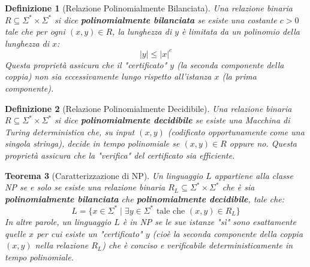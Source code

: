 \documentclass[a4paper, 11pt]{book} %
\newtheorem{theorem}{Teorema}[section]
\newtheorem{definition}[theorem]{Definizione}
\theoremstyle{definition}
\begin{document}
\begin{definition}[Relazione Polinomialmente Bilanciata]
Una relazione binaria $R \subseteq \Sigma^* \times \Sigma^*$ si dice \textbf{polinomialmente bilanciata} se esiste una costante $c > 0$ tale che per ogni $(x, y) \in R$, la lunghezza di $y$ è limitata da un polinomio della lunghezza di $x$:
\[ |y| \le |x|^c \]
Questa proprietà assicura che il "certificato" $y$ (la seconda componente della coppia) non sia eccessivamente lungo rispetto all'istanza $x$ (la prima componente).
\end{definition}

\begin{definition}[Relazione Polinomialmente Decidibile]
Una relazione binaria $R \subseteq \Sigma^* \times \Sigma^*$ si dice \textbf{polinomialmente decidibile} se esiste una Macchina di Turing deterministica che, su input $(x, y)$ (codificato opportunamente come una singola stringa), decide in tempo polinomiale se $(x, y) \in R$ oppure no.
Questa proprietà assicura che la "verifica" del certificato sia efficiente.
\end{definition}

\begin{theorem}[Caratterizzazione di NP]
Un linguaggio $L$ appartiene alla classe NP se e solo se esiste una relazione binaria $R_L \subseteq \Sigma^* \times \Sigma^*$ che è sia \textbf{polinomialmente bilanciata} che \textbf{polinomialmente decidibile}, tale che:
\[ L = \{x \in \Sigma^* \mid \exists y \in \Sigma^* \text{ tale che } (x, y) \in R_L \} \]
In altre parole, un linguaggio $L$ è in NP se le sue istanze "sì" sono esattamente quelle $x$ per cui esiste un "certificato" $y$ (cioè la seconda componente della coppia $(x, y)$ nella relazione $R_L$) che è conciso e verificabile deterministicamente in tempo polinomiale.
\end{theorem}
\end{document}
